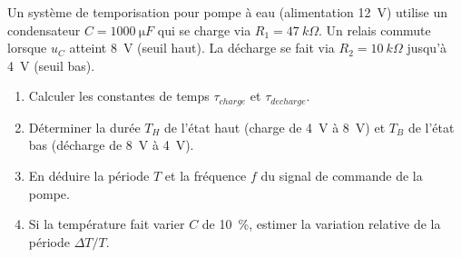 \documentclass[11pt]{article}
\begin{document}
\begin{exercice}
Un système de temporisation pour pompe à eau (alimentation \SI{12}{V}) utilise un condensateur $C = \SI{1000}{\micro F}$ qui se charge via $R_1 = \SI{47}{k\Omega}$. Un relais commute lorsque $u_C$ atteint \SI{8}{V} (seuil haut). La décharge se fait via $R_2 = \SI{10}{k\Omega}$ jusqu'à \SI{4}{V} (seuil bas).
\begin{enumerate}
    \item Calculer les constantes de temps $\tau_{charge}$ et $\tau_{decharge}$.
    \item Déterminer la durée $T_H$ de l'état haut (charge de \SI{4}{V} à \SI{8}{V}) et $T_B$ de l'état bas (décharge de \SI{8}{V} à \SI{4}{V}).
    \item En déduire la période $T$ et la fréquence $f$ du signal de commande de la pompe.
    \item Si la température fait varier $C$ de \SI{+10}{\%}, estimer la variation relative de la période $\Delta T / T$.
\end{enumerate}
\end{exercice}
\end{document}
